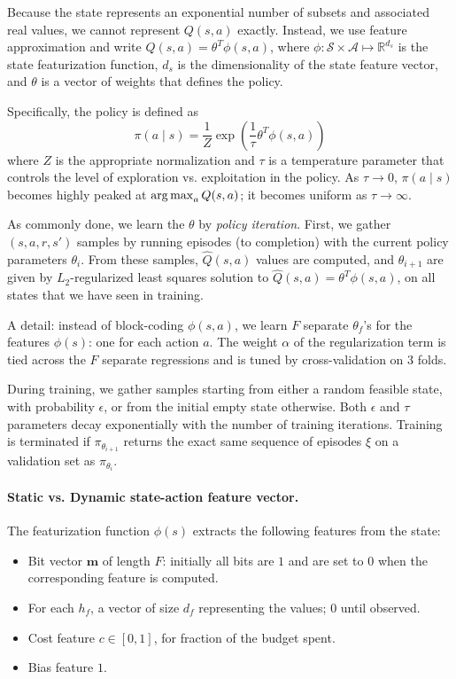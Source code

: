 Because the state represents an exponential number of subsets and associated real values, we cannot represent $Q(s,a)$ exactly.
Instead, we use feature approximation and write $Q(s,a) = \theta^T \phi(s, a)$,  where $\phi: \mathcal{S} \times \mathcal{A} \mapsto \mathbb{R}^{d_s}$ is the state featurization function, $d_s$ is the dimensionality of the state feature vector, and $\theta$ is a vector of weights that defines the policy.

Specifically, the policy is defined as
\begin{equation}
\pi(a \mid s) = \frac{1}{Z} \exp\left(\frac{1}{\tau} \theta^T \phi(s, a)\right)
\end{equation}
where $Z$ is the appropriate normalization and $\tau$ is a temperature parameter that controls the level of exploration vs. exploitation in the policy.
As $\tau \rightarrow 0$, ${\pi(a \mid s)}$ becomes highly peaked at $\operatorname*{arg\,max}_a Q(s,a)$; it becomes uniform as $\tau \rightarrow \infty$.

As commonly done, we learn the $\theta$ by \emph{policy iteration}.
First, we gather $(s, a, r, s')$ samples by running episodes (to completion) with the current policy parameters $\theta_i$.
From these samples, $\hat{Q}(s, a)$ values are computed, and $\theta_{i+1}$ are given by $L_2$-regularized least squares solution to $\hat{Q}(s, a) = \theta^T \phi(s, a)$, on all states that we have seen in training.


A detail: instead of block-coding $\phi(s,a)$, we learn $F$ separate $\theta_f$'s for the features $\phi(s)$: one for each action $a$.
The weight $\alpha$ of the regularization term is tied across the $F$ separate regressions and is tuned by cross-validation on 3 folds.

During training, we gather samples starting from either a random feasible state, with probability $\epsilon$, or from the initial empty state otherwise.
Both $\epsilon$ and $\tau$ parameters decay exponentially with the number of training iterations.
Training is terminated if $\pi_{\theta_{i+1}}$ returns the exact same sequence of episodes $\xi$ on a validation set as $\pi_{\theta_{i}}$.

\paragraph{Static vs. Dynamic state-action feature vector.}\label{sec:policy_features}
The featurization function $\phi(s)$ extracts the following features from the state:
\begin{itemize}\addtolength{\itemsep}{-.5\baselineskip}
\item Bit vector $\textbf{m}$ of length $F$: initially all bits are $1$ and are set to $0$ when the corresponding feature is computed.
\item For each $h_f$, a vector of size $d_f$ representing the values; $0$ until observed.
\item Cost feature $c \in [0, 1]$, for fraction of the budget spent.
\item Bias feature $1$.
\end{itemize}

